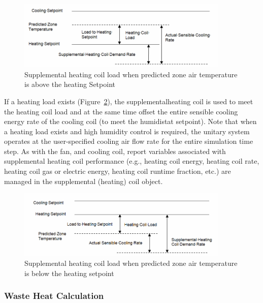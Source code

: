 \begin{figure}[hbtp] %
\centering
\includegraphics[width=0.9\textwidth, height=0.9\textheight, keepaspectratio=true]{media/image5015.png}
\caption{Supplemental heating coil load when predicted zone air temperature is above the heating Setpoint \protect \label{fig:supplemental-heating-coil-load-when-predicted}}
\end{figure}

If a heating load exists (Figure~\ref{fig:supplemental-heating-coil-load-when-predicted-001}), the supplementalheating coil is used to meet the heating coil load and at the same time offset the entire sensible cooling energy rate of the cooling coil (to meet the humidistat setpoint). Note that when a heating load exists and high humidity control is required, the unitary system operates at the user-specified cooling air flow rate for the entire simulation time step. As with the fan, and cooling coil, report variables associated with supplemental heating coil performance (e.g., heating coil energy, heating coil rate, heating coil gas or electric energy, heating coil runtime fraction, etc.) are managed in the supplemental (heating) coil object.

\begin{figure}[hbtp] %
\centering
\includegraphics[width=0.9\textwidth, height=0.9\textheight, keepaspectratio=true]{media/image5016.png}
\caption{Supplemental heating coil load when predicted zone air temperature is below the heating setpoint \protect \label{fig:supplemental-heating-coil-load-when-predicted-001}}
\end{figure}

\subsubsection{Waste Heat Calculation}\label{waste-heat-calculation}

